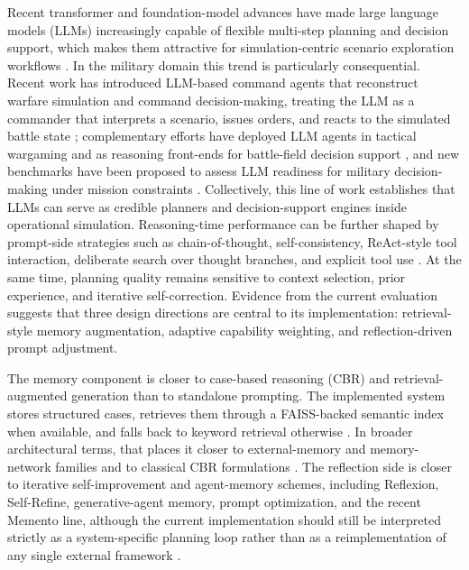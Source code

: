 Recent transformer and foundation-model advances have made large language models (LLMs) increasingly capable of flexible multi-step planning and decision support, which makes them attractive for simulation-centric scenario exploration workflows \citep{vaswani2017attention,devlin2019bert,brown2020llm,openai2023gpt4,touvron2023llama,touvron2023llama2,zhao2023llmsurvey,yang2024chatgptsurvey}. In the military domain this trend is particularly consequential. Recent work has introduced LLM-based command agents that reconstruct warfare simulation and command decision-making, treating the LLM as a commander that interprets a scenario, issues orders, and reacts to the simulated battle state \citep{liu2026commandagent}; complementary efforts have deployed LLM agents in tactical wargaming and as reasoning front-ends for battle-field decision support \citep{geo2026commander,liu2026tacticalwargame}, and new benchmarks have been proposed to assess LLM readiness for military decision-making under mission constraints \citep{warbench2026}. Collectively, this line of work establishes that LLMs can serve as credible planners and decision-support engines inside operational simulation. Reasoning-time performance can be further shaped by prompt-side strategies such as chain-of-thought, self-consistency, ReAct-style tool interaction, deliberate search over thought branches, and explicit tool use \citep{wei2022cot,wang2023selfconsistency,yao2023react,yao2023tree,schick2023toolformer}. At the same time, planning quality remains sensitive to context selection, prior experience, and iterative self-correction. Evidence from the current evaluation suggests that three design directions are central to its implementation: retrieval-style memory augmentation, adaptive capability weighting, and reflection-driven prompt adjustment.

The memory component is closer to case-based reasoning (CBR) and retrieval-augmented generation than to standalone prompting. The implemented system stores structured cases, retrieves them through a FAISS-backed semantic index when available, and falls back to keyword retrieval otherwise \citep{lewis2020rag,karpukhin2020dpr,johnson2019faiss,reimers2019sbert}. In broader architectural terms, that places it closer to external-memory and memory-network families \citep{graves2014ntm,weston2015memorynetworks,sukhbaatar2015endtoendmemory} and to classical CBR formulations \citep{aamodt1994cbr,kolodner1993cbr}. The reflection side is closer to iterative self-improvement and agent-memory schemes, including Reflexion, Self-Refine, generative-agent memory, prompt optimization, and the recent Memento line, although the current implementation should still be interpreted strictly as a system-specific planning loop rather than as a reimplementation of any single external framework \citep{shinn2023reflexion,madaan2023selfrefine,guo2024promptoptimizer,zhou2025memento,park2023generativeagents}.

